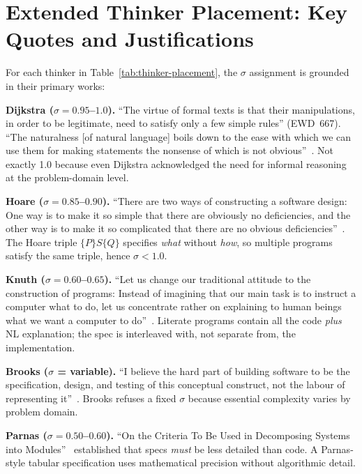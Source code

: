\documentclass[11pt, a4paper, copyright]{googledeepmind}
\begin{document}
\section{Extended Thinker Placement: Key Quotes and Justifications}
\label{app:thinker-quotes}

For each thinker in Table~\ref{tab:thinker-placement}, the $\sigma$ assignment is grounded in their primary works:

\textbf{Dijkstra ($\sigma = 0.95$--$1.0$).} ``The virtue of formal texts is that their manipulations, in order to be legitimate, need to satisfy only a few simple rules'' (EWD~667). ``The naturalness [of natural language] boils down to the ease with which we can use them for making statements the nonsense of which is not obvious''~\citep{dijkstra1978foolishness}. Not exactly 1.0 because even Dijkstra acknowledged the need for informal reasoning at the problem-domain level.

\textbf{Hoare ($\sigma = 0.85$--$0.90$).} ``There are two ways of constructing a software design: One way is to make it so simple that there are obviously no deficiencies, and the other way is to make it so complicated that there are no obvious deficiencies''~\citep{hoare1981emperor}. The Hoare triple $\{P\}S\{Q\}$ specifies \emph{what} without \emph{how}, so multiple programs satisfy the same triple, hence $\sigma < 1.0$.

\textbf{Knuth ($\sigma = 0.60$--$0.65$).} ``Let us change our traditional attitude to the construction of programs: Instead of imagining that our main task is to instruct a computer what to do, let us concentrate rather on explaining to human beings what we want a computer to do''~\citep{knuth1984literate}. Literate programs contain all the code \emph{plus} NL explanation; the spec is interleaved with, not separate from, the implementation.

\textbf{Brooks ($\sigma$ = variable).} ``I believe the hard part of building software to be the specification, design, and testing of this conceptual construct, not the labour of representing it''~\citep{brooks1987nosilver}. Brooks refuses a fixed $\sigma$ because essential complexity varies by problem domain.

\textbf{Parnas ($\sigma = 0.50$--$0.60$).} ``On the Criteria To Be Used in Decomposing Systems into Modules''~\citep{parnas1972criteria} established that specs \emph{must} be less detailed than code. A Parnas-style tabular specification uses mathematical precision without algorithmic detail.
\end{document}
